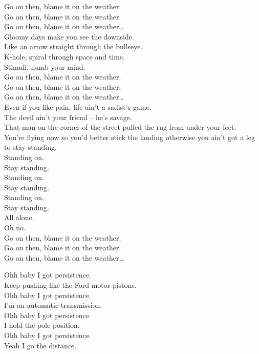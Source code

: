 Go on then, blame it on the weather. \\
Go on then, blame it on the weather. \\
Go on then, blame it on the weather… \\

Gloomy days make you see the downside. \\
Like an arrow straight through the bullseye. \\
K-hole, spiral through space and time. \\
Stimuli, numb your mind. \\

Go on then, blame it on the weather. \\
Go on then, blame it on the weather. \\
Go on then, blame it on the weather… \\

Even if you like pain, life ain't a sadist's game. \\
The devil ain't your friend -- he's savage. \\
That man on the corner of the street pulled the rug from under your feet. \\
You're flying now so you'd better stick the landing otherwise you ain't got a leg to stay standing. \\
Standing on. \\

Stay standing. \\
Standing on. \\
Stay standing. \\
Standing on. \\
Stay standing. \\
All alone. \\
Oh no. \\

Go on then, blame it on the weather. \\
Go on then, blame it on the weather. \\
Go on then, blame it on the weather… \\




Ohh baby I got persistence. \\
Keep pushing like the Ford motor pistons. \\
Ohh baby I got persistence. \\
I'm an automatic transmission. \\
Ohh baby I got persistence. \\
I hold the pole position. \\
Ohh baby I got persistence. \\
Yeah I go the distance. \\

